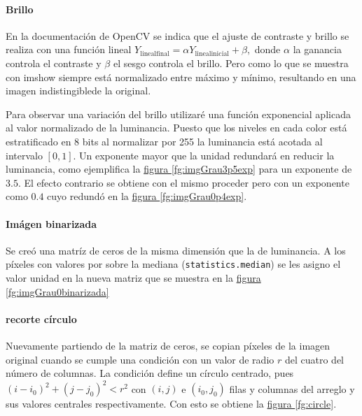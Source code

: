 \documentclass{article}
\begin{document}
\paragraph{Brillo}
En la documentación de OpenCV se indica que el ajuste de contraste y brillo se realiza con una función lineal \cite{noauthor_opencv_nodate}
$
Y_\mathrm{lineal final} = \alpha Y_\mathrm{lineal inicial} + \beta ,
$
donde $\alpha$ la ganancia controla el contraste y $\beta$ el sesgo controla el brillo.
Pero como lo que se muestra con imshow siempre está normalizado entre máximo y mínimo, resultando en una imagen indistingiblede la original.

Para observar una variación del brillo utilizaré una función exponencial aplicada al valor normalizado de la luminancia.
Puesto que los niveles en cada color está estratificado en 8 bits al normalizar por 255 la luminancia está acotada al intervalo $[0,1]$.
Un exponente mayor que la unidad redundará en reducir la luminancia, como ejemplifica la \hyperref[fg:imgGrau3p5exp]{figura \ref*{fg:imgGrau3p5exp}} para un exponente de \(3.5\).
El efecto contrario se obtiene con el mismo proceder pero con un exponente como \(0.4\) cuyo redundó en la \hyperref[fg:imgGrau0p4exp]{figura \ref*{fg:imgGrau0p4exp}}. 




\paragraph{Imágen binarizada}	
Se creó una matríz de ceros de la misma dimensión que la de luminancia.
A los píxeles con valores por sobre la mediana (\verb'statistics.median') se les asigno el valor unidad en la nueva matriz que se muestra en la \hyperref[fg:imgGrau0binarizada]{figura \ref*{fg:imgGrau0binarizada}}






\paragraph{recorte círculo}
Nuevamente partiendo de la matriz de ceros, se copian píxeles de la imagen original cuando se cumple una condición con un valor de radio \(r\) del cuatro del número de columnas.
La condición define un círculo centrado, pues \((i- i_0)^2 + (j- j_0)^2 < r^2\) con \((i,j)\) e \((i_0, j_0)\) filas y columnas del arreglo y sus valores centrales respectivamente.
Con esto se obtiene la \hyperref[fg:circle]{figura \ref*{fg:circle}}. 
\end{document}
